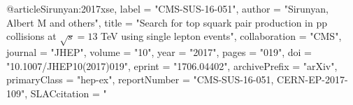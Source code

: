 @article{Sirunyan:2017xse,
      label          = "CMS-SUS-16-051",
      author         = "Sirunyan, Albert M and others",
      title          = "{Search for top squark pair production in pp collisions
                        at $ \sqrt{s}=13 $ TeV using single lepton events}",
      collaboration  = "CMS",
      journal        = "JHEP",
      volume         = "10",
      year           = "2017",
      pages          = "019",
      doi            = "10.1007/JHEP10(2017)019",
      eprint         = "1706.04402",
      archivePrefix  = "arXiv",
      primaryClass   = "hep-ex",
      reportNumber   = "CMS-SUS-16-051, CERN-EP-2017-109",
      SLACcitation   = "%
}

